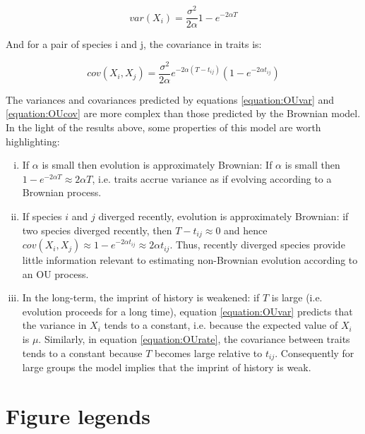 \documentclass[a4paper,12pt]{article}
\begin{document}
    \begin{equation}
      var(X_i) = \frac{\sigma^2}{2 \alpha} 1 - e^{-2 \alpha T}
      \label{equation:OUvar} 
    \end{equation}

  And for a pair of species i and j, the covariance in traits is:

    \begin{equation}
      cov(X_i, X_j) = \frac{\sigma^2}{2 \alpha} e^{-2 \alpha (T - t_{ij})} (1 - e^{-2\alpha t_{ij}})
      \label{equation:OUcov} 
    \end{equation}

  The variances and covariances predicted by equations \ref{equation:OUvar} and \ref{equation:OUcov} are more complex than those predicted by the Brownian model. 
  In the light of the results above, some properties of this model are worth highlighting:

  \begin{enumerate}[(i)]
    \item If $\alpha$ is small then evolution is approximately Brownian: If $\alpha$ is small then $1 - e^{-2\alpha T} \approx 2\alpha T$, i.e. traits accrue variance as if evolving according to a Brownian process.\\ 

    \item If species $i$ and $j$ diverged recently, evolution is approximately Brownian: if two species diverged recently, then $T - t_{ij} \approx 0$ and hence $cov(X_i, X_j) \approx 1 - e^{-2\alpha t_{ij}} \approx 2\alpha t_{ij}$. 
    Thus, recently diverged species provide little information relevant to estimating non-Brownian evolution according to an OU process.\\ 

    \item In the long-term, the imprint of history is weakened: if $T$ is large (i.e. evolution proceeds for a long time), equation \ref{equation:OUvar} predicts that the variance in $X_i$ tends to a constant, i.e. because the expected value of $X_i$ is $\mu$. 
    Similarly, in equation \ref{equation:OUrate}, the covariance between traits tends to a constant because $T$ becomes large relative to $t_{ij}$.
    Consequently for large groups the model implies that the imprint of history is weak.\\
  \end{enumerate}

\newpage
\section{Figure legends}
\end{document}
